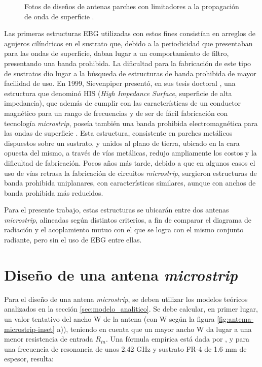 \begin{figure}[H]
	\centering 
	\hspace{30pt}
	\caption{Fotos de diseños de antenas parches con limitadores a la propagación de onda de superficie \cite{Yang:EBGAntennas}.}
	\label{fig:limitadores-ondas-superficie-yang}
\end{figure}

Las primeras estructuras EBG utilizadas con estos fines consistían en arreglos de agujeros cilíndricos en el sustrato que, debido a la periodicidad que presentaban para las ondas de superficie, daban lugar a un comportamiento de filtro, presentando una banda prohibida. La dificultad para la fabricación de este tipo de sustratos dio lugar a la búsqueda de estructuras de banda prohibida de mayor facilidad de uso. En 1999, Sievenpiper presentó, en sus tesis doctoral \cite{Sievenpiper:Thesis}, una estructura que denominó HIS (\textit{High Impedance Surface}, superficie de alta impedancia), que además de cumplir con las características de un conductor magnético para un rango de frecuencias \cite{Sievenpiper:HIESForbiddenBand} y de ser de fácil fabricación con tecnología \textit{microstrip}, poseía también una banda prohibida electromagnética para las ondas de superficie \cite{Marcela:Tesis}. Esta estructura, consistente en parches metálicos dispuestos sobre un sustrato, y unidos al plano de tierra, ubicado en la cara opuesta del mismo, a través de vías metálicas, redujo ampliamente los costos y la dificultad de fabricación. Pocos años más tarde, debido a que en algunos casos el uso de vías retrasa la fabricación de circuitos \textit{microstrip}, surgieron estructuras de banda prohibida uniplanares, con características similares, aunque con anchos de banda prohibida más reducidos.

Para el presente trabajo, estas estructuras se ubicarán entre dos antenas \textit{microstrip}, alineadas según distintos criterios, a fin de comparar el diagrama de radiación y el acoplamiento mutuo con el que se logra con el mismo conjunto radiante, pero sin el uso de EBG entre ellas.


\section{Diseño de una antena \textit{microstrip}}
\label{sec_disenio_microstrip}
Para el diseño de una antena \textit{microstrip}, se deben utilizar los modelos teóricos analizados en la sección \ref{sec:modelo_analitico}. Se debe calcular, en primer lugar, un valor tentativo del ancho W de la antena (con W según la figura \ref{fig:antema-microstrip-inset} a)), teniendo en cuenta que un mayor ancho W da lugar a una menor resistencia de entrada $R_{in}$. Una fórmula empírica está dada por \cite{Barthia:Handbook}, y para una frecuencia de resonancia de unos 2.42 GHz y sustrato FR-4 de 1.6 mm de espesor, resulta:

